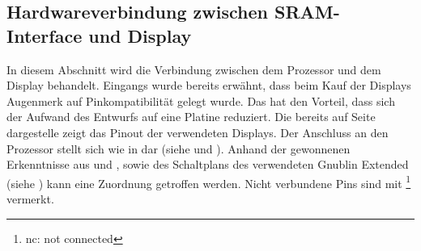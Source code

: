 \newpage
\subsection{Hardwareverbindung zwischen SRAM-Interface und Display}
In diesem Abschnitt wird die Verbindung zwischen dem Prozessor und dem Display behandelt. Eingangs wurde bereits erwähnt, dass beim Kauf der Displays Augenmerk auf Pinkompatibilität gelegt wurde. Das hat den Vorteil, dass sich der Aufwand des Entwurfs auf eine Platine reduziert. \newline
Die bereits auf Seite \pageref{fig:8080_pinout} dargestelle  zeigt das Pinout der verwendeten Displays. Der Anschluss an den Prozessor stellt sich wie in  dar (siehe \cite{Coldtears2014} und \cite{EmbeddedProjects2013}). Anhand der gewonnenen Erkenntnisse aus  und , sowie des Schaltplans des verwendeten Gnublin Extended (siehe \cite{EmbeddedProjects2013}) kann eine Zuordnung getroffen werden. Nicht verbundene Pins sind mit \footnote{nc: not connected} vermerkt.

